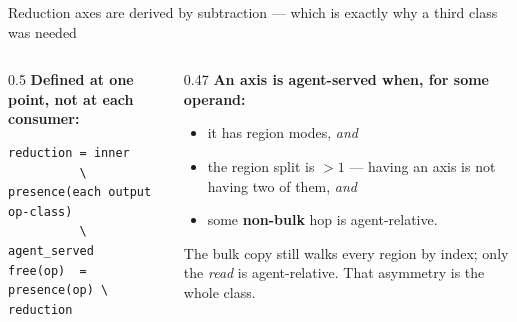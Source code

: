 \documentclass[aspectratio=169,9pt]{beamer}
\newcommand{\tsub}[1]{{\footnotesize\color{gray}#1}}
\newcommand{\key}[1]{\textcolor{acc}{\textbf{#1}}}
\newcommand{\bad}[1]{\textcolor{warn}{\textbf{#1}}}
\newcommand{\good}[1]{\textcolor{ok}{\textbf{#1}}}
\begin{document}
\begin{frame}[fragile]{Reduction axes are derived by subtraction --- which is exactly why a third class was needed}
\begin{center}
\end{center}
\vspace{-2pt}
\begin{columns}[T]
\begin{column}{0.5\textwidth}
\textbf{Defined at one point, not at each consumer:}
\begin{lstlisting}[style=pseudo]
reduction = inner
          \ presence(each output op-class)
          \ agent_served
free(op)  = presence(op) \ reduction
\end{lstlisting}
\end{column}
\begin{column}{0.47\textwidth}
\textbf{An axis is agent-served when, for some operand:}
\begin{itemize}\itemsep0pt
\item it has region modes, \emph{and}
\item the region split is $>1$ --- having an axis is not having two of them, \emph{and}
\item some \key{non-bulk} hop is agent-relative.
\end{itemize}
\vspace{2pt}
The bulk copy still walks every region by index; only the \emph{read} is agent-relative.
That asymmetry is the whole class.
\end{column}
\end{columns}
\end{frame}
\end{document}

